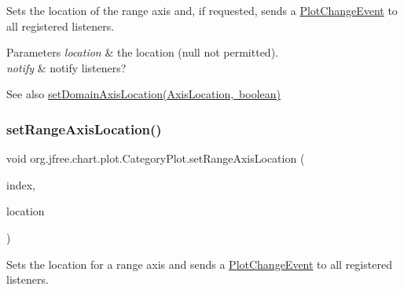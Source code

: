 Sets the location of the range axis and, if requested, sends a \mbox{\hyperlink{}{Plot\+Change\+Event}} to all registered listeners.


\begin{DoxyParams}{Parameters}
{\em location} & the location ({\ttfamily null} not permitted). \\
\hline
{\em notify} & notify listeners?\\
\hline
\end{DoxyParams}
\begin{DoxySeeAlso}{See also}
\mbox{\hyperlink{classorg_1_1jfree_1_1chart_1_1plot_1_1_category_plot_a41de193ebdcfd2a1ea3622f2aac896d5}{set\+Domain\+Axis\+Location(\+Axis\+Location, boolean)}} 
\end{DoxySeeAlso}
\mbox{\label{classorg_1_1jfree_1_1chart_1_1plot_1_1_category_plot_a242adbc02f7e5b651062dbddfcfd9765}} 
\subsubsection{\texorpdfstring{set\+Range\+Axis\+Location()}{setRangeAxisLocation()}\hspace{0.1cm}{\footnotesize\ttfamily [3/4]}}
{\footnotesize\ttfamily void org.\+jfree.\+chart.\+plot.\+Category\+Plot.\+set\+Range\+Axis\+Location (\begin{DoxyParamCaption}\item[{int}]{index,  }\item[{\mbox{\hyperlink{classorg_1_1jfree_1_1chart_1_1axis_1_1_axis_location}{Axis\+Location}}}]{location }\end{DoxyParamCaption})}

Sets the location for a range axis and sends a \mbox{\hyperlink{}{Plot\+Change\+Event}} to all registered listeners.


